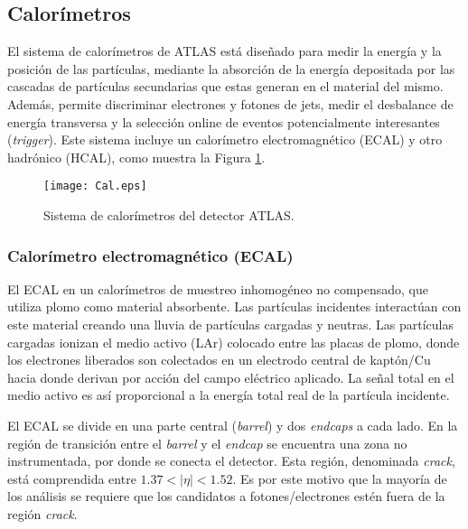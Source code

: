 \subsection{Calorímetros}

El sistema de calorímetros de ATLAS está diseñado para medir la energía y la posición de las partículas, mediante la absorción de la energía depositada por las cascadas de partículas secundarias que estas generan en el material del mismo. Además, permite discriminar electrones y fotones de jets, medir el desbalance de energía transversa y la selección online de eventos potencialmente interesantes (\textit{trigger}). Este sistema incluye un calorímetro electromagnético (ECAL) y otro hadrónico (HCAL), como muestra la Figura \ref{Cal}.

\begin{figure}
\centering
\texttt{[image: Cal.eps]}
\caption{Sistema de calorímetros del detector ATLAS.}
\label{Cal}
\end{figure}

\subsubsection{Calorímetro electromagnético (ECAL)}

El ECAL en un calorímetros de muestreo inhomogéneo no compensado, que utiliza plomo como material absorbente. Las partículas incidentes interactúan con este material creando una lluvia de partículas cargadas y neutras. Las partículas cargadas ionizan el medio activo (LAr) colocado entre las placas de plomo, donde los electrones liberados son colectados en un electrodo central de kaptón/Cu hacia donde derivan por acción del campo eléctrico aplicado. La señal total en el medio activo es así proporcional a la energía total real de la partícula incidente.


El ECAL se divide en una parte central (\textit{barrel}) y dos \textit{endcaps} a cada lado. En la región de transición entre el \textit{barrel} y el \textit{endcap} se encuentra una zona no instrumentada, por donde se conecta el detector. Esta región, denominada \textit{crack}, está comprendida entre $1.37 < |\eta| < 1.52$. Es por este motivo que la mayoría de los análisis se requiere que los candidatos a fotones/electrones estén fuera de la región \textit{crack}.


